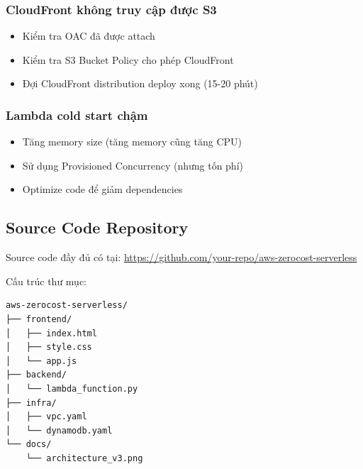\subsubsection{CloudFront không truy cập được S3}

\begin{itemize}
    \item Kiểm tra OAC đã được attach
    \item Kiểm tra S3 Bucket Policy cho phép CloudFront
    \item Đợi CloudFront distribution deploy xong (15-20 phút)
\end{itemize}

\subsubsection{Lambda cold start chậm}

\begin{itemize}
    \item Tăng memory size (tăng memory cũng tăng CPU)
    \item Sử dụng Provisioned Concurrency (nhưng tốn phí)
    \item Optimize code để giảm dependencies
\end{itemize}

\subsection{Source Code Repository}
\label{ssec:source_code}

Source code đầy đủ có tại: \url{https://github.com/your-repo/aws-zerocost-serverless}

Cấu trúc thư mục:
\begin{verbatim}
aws-zerocost-serverless/
├── frontend/
│   ├── index.html
│   ├── style.css
│   └── app.js
├── backend/
│   └── lambda_function.py
├── infra/
│   ├── vpc.yaml
│   └── dynamodb.yaml
└── docs/
    └── architecture_v3.png
\end{verbatim}

